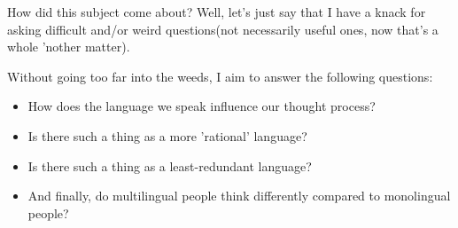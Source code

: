 How did this subject come about? Well, let's just say that I have a knack for asking difficult and/or weird questions(not necessarily useful ones, now that's a whole 'nother matter).\par
				Without going too far into the weeds, I aim to answer the following questions:\par
				\begin{itemize}
					\item How does the language we speak influence our thought process?
					\item Is there such a thing as a more 'rational' language?
					\item Is there such a thing as a least-redundant language?
					\item And finally, do multilingual people think differently compared to monolingual people?
			\end{itemize}
